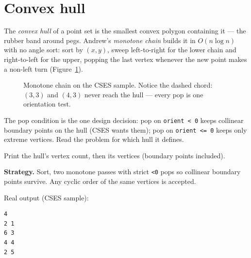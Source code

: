 \section{Convex hull}\label{sec:hull}
The \emph{convex hull} of a point set is the smallest convex
polygon containing it --- the rubber band around pegs. Andrew's
\emph{monotone chain} builds it in $O(n\log n)$ with no angle
sort: sort by $(x,y)$, sweep left-to-right for the lower chain
and right-to-left for the upper, popping the last vertex
whenever the new point makes a non-left turn
(Figure~\ref{fig:hull}).
\begin{figure}[ht]\centering

\caption{Monotone chain on the CSES sample. Notice the dashed
chord: $(3,3)$ and $(4,3)$ never reach the hull --- every pop is
one orientation test.}
\label{fig:hull}
\end{figure}
The pop condition is the one design decision: pop on
\texttt{orient < 0} keeps collinear boundary points on the hull
(CSES wants them); pop on \texttt{orient <= 0} keeps only extreme
vertices. Read the problem for which hull it defines.

\begin{example}\label{ex:hull}
Print the hull's vertex count, then its vertices (boundary
points included).
\par\smallskip
\textbf{Strategy.} Sort, two monotone passes with strict
\texttt{<0} pops so collinear boundary points survive. Any
cyclic order of the same vertices is accepted.
\par\smallskip
\begin{solution}

Real output (CSES sample):
\begin{lstlisting}[numbers=none]
4
2 1
6 3
4 4
2 5
\end{lstlisting}
\end{solution}
\end{example}

